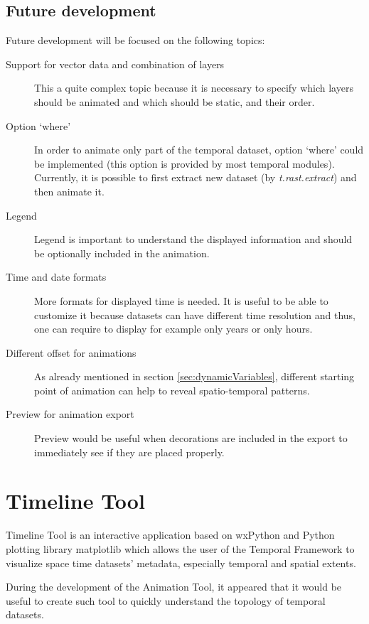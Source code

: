 \documentclass[a4paper,12pt,oneside]{book}
\newcommand{\module}[1]{\textsl{#1}}
\newcommand{\tf}{Temporal Framework\xspace}
\newcommand{\at}{Animation Tool\xspace}
\begin{document}
\subsection{Future development}
Future development will be focused on the following topics:
\begin{description}
  \item [Support for vector data and combination of layers]
  This a quite complex topic because it is necessary to specify which layers should be animated and
  which should be static, and their order.
  \item [Option `where'] In order to animate only part of the temporal dataset,
  option `where' could be implemented (this option is provided by most temporal modules).
  Currently, it is possible to first extract new dataset (by \module{t.rast.extract})
  and then animate it.
  
  \item [Legend] Legend is important to understand the displayed information and
  should be optionally included in the animation.
  \item [Time and date formats] More formats for displayed time is needed.
  It is useful to be able to customize it because datasets can have different
  time resolution and thus, one can require to display for example only years or only hours.

  \item [Different offset for animations] As already mentioned in section \ref{sec:dynamicVariables},
  different starting point of animation can help to reveal spatio-temporal patterns.

  \item [Preview for animation export] Preview would be useful when decorations are included in the export
  to immediately see if they are placed properly.
  
\end{description}



\section{Timeline Tool}
Timeline Tool is an interactive application based on wxPython and Python plotting library matplotlib \cite{matplotlib} which allows
the user of the \tf to visualize space time datasets' metadata, especially temporal and spatial extents.

During the development of the \at, it appeared that it would be useful to create such tool
to quickly understand the topology of temporal datasets. 
\end{document}
